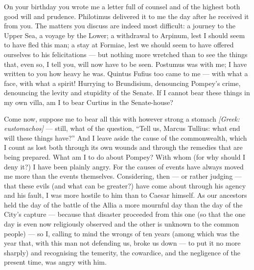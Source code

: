 

 On your birthday you wrote me a letter full of counsel and of the highest both good will and prudence. Philotimus delivered it to me the day after he received it from you. The matters you discuss are indeed most difficult: a journey to the Upper Sea, a voyage by the Lower; a withdrawal to Arpinum, lest I should seem to have fled this man; a stay at Formiae, lest we should seem to have offered ourselves to his felicitations --- but nothing more wretched than to see the things that, even so, I tell you, will now have to be seen. Postumus was with me; I have written to you how heavy he was. Quintus Fufius too came to me --- with what a face, with what a spirit! Hurrying to Brundisium, denouncing Pompey's crime, denouncing the levity and stupidity of the Senate. If I cannot bear these things in my own villa, am I to bear Curtius in the Senate-house?

 Come now, suppose me to bear all this with however strong a stomach \textit{[Greek: eustomachos]} --- still, what of the question, ``Tell us, Marcus Tullius: what end will these things have?'' And I leave aside the cause of the commonwealth, which I count as lost both through its own wounds and through the remedies that are being prepared. What am I to do about Pompey? With whom (for why should I deny it?) I have been plainly angry. For the causes of events have always moved me more than the events themselves. Considering, then --- or rather judging --- that these evils (and what can be greater?) have come about through his agency and his fault, I was more hostile to him than to Caesar himself. As our ancestors held the day of the battle of the Allia a more mournful day than the day of the City's capture --- because that disaster proceeded from this one (so that the one day is even now religiously observed and the other is unknown to the common people) --- so I, calling to mind the wrongs of ten years (among which was the year that, with this man not defending us, broke us down --- to put it no more sharply) and recognising the temerity, the cowardice, and the negligence of the present time, was angry with him.

